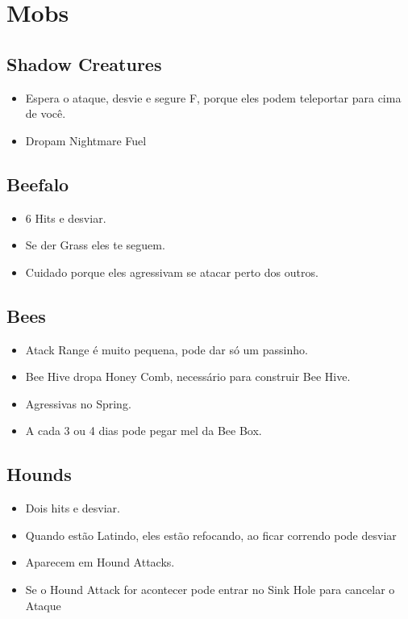 \documentclass{article}
\begin{document}
\section{Mobs}



\subsection*{Shadow Creatures}
\begin{itemize}
    \item Espera o ataque, desvie e segure F, porque eles podem teleportar para cima de você. 
    \item Dropam Nightmare Fuel
\end{itemize}

\subsection*{Beefalo}
\begin{itemize}
    \item 6 Hits e desviar.
    \item Se der Grass eles te seguem.
    \item Cuidado porque eles agressivam se atacar perto dos outros.
\end{itemize}

\subsection*{Bees}
\begin{itemize}
    \item Atack Range é muito pequena, pode dar só um passinho.
    \item Bee Hive dropa Honey Comb, necessário para construir Bee Hive.
    \item Agressivas no Spring.
    \item A cada 3 ou 4 dias pode pegar mel da Bee Box.
\end{itemize}

\subsection*{Hounds}
\begin{itemize}
\item Dois hits e desviar. 
\item Quando estão Latindo, eles estão refocando, ao ficar correndo pode desviar
\item Aparecem em Hound Attacks.
\item Se o Hound Attack for acontecer pode entrar no Sink Hole para cancelar o Ataque
\end{itemize}
\end{document}
